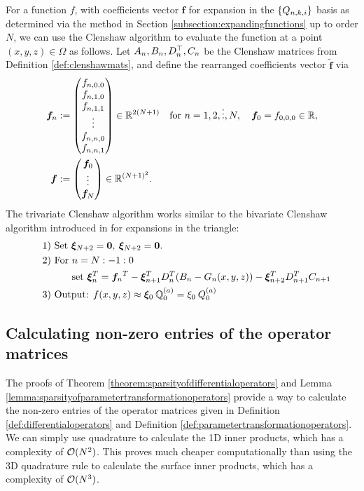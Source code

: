\documentclass[11pt, oneside]{article}   	%
\begin{document}
For a function $f$, with coefficients vector $\bm{f}$ for expansion in the $\{Q_{n,k,i}\}$ basis as determined via the method in Section \ref{subsection:expandingfunctions} up to order $N$, we can use the Clenshaw algorithm to evaluate the function at a point $(x,y,z) \in \Omega$ as follows. Let $A_n, B_n, D^\top_n, C_n$ be the Clenshaw matrices from Definition \ref{def:clenshawmats}, and define the rearranged coefficients vector $\tilde{\bm{f}}$ via
\begin{align*}
	{\bm{f}}_n &:= 
		\begin{pmatrix}
			f_{n,0,0} \\
			f_{n,1,0} \\
			f_{n,1,1} \\
			\vdots \\
			f_{n,n,0} \\
			f_{n,n,1}
		\end{pmatrix} \in \mathbb{R}^{2(N+1)} \quad \text{for } n = 1,2,\vdots,N, \quad
	{\bm{f}}_0 = f_{0,0,0} \in \mathbb{R}, \\
	{\bm{f}} &:= 
		\begin{pmatrix}
			{\bm{f}}_0 \\
			\vdots \\
			{\bm{f}}_N
		\end{pmatrix} \in \mathbb{R}^{(N+1)^2}.
\end{align*}
The trivariate Clenshaw algorithm works similar to the bivariate Clenshaw algorithm introduced in \cite{olver2019triangle} for expansions in the triangle:
\begin{align*}
	\quad &\text{1) } \text{Set } \bm{\xi}_{N+2} = \bold{0}, \: \bm{\xi}_{N+2} = \bold{0}. \\
	\quad &\text{2) } \text{For } n = N:-1:0 \\
	\quad & \quad \quad \quad \text{set } \bm{\xi}_{n}^T = {{\bm{f}}_n}^T - \bm{\xi}_{n+1}^T D^T_n (B_n - G_n(x,y,z)) -  \bm{\xi}_{n+2}^T D^T_{n+1}C_{n+1} \\
	\quad &\text{3) } \text{Output: } f(x,y,z) \approx \bm{\xi}_{0} \: \mathbb{{Q}}^{(a)}_{0}  = \xi_{0} \: Q^{(a)}_0
\end{align*}


\subsection{Calculating non-zero entries of the operator matrices}\label{subsection:Computation-operatormatrices}

The proofs of Theorem \ref{theorem:sparsityofdifferentialoperators} and Lemma \ref{lemma:sparsityofparametertransformationoperators} provide a way to calculate the non-zero entries of the operator matrices given in Definition \ref{def:differentialoperators} and Definition \ref{def:parametertransformationoperators}. We can simply use quadrature to calculate the 1D inner products, which has a complexity of $\mathcal{O}(N^2)$. This proves much cheaper computationally than using the 3D quadrature rule to calculate the surface inner products, which has a complexity of $\mathcal{O}(N^3)$.
\end{document}

